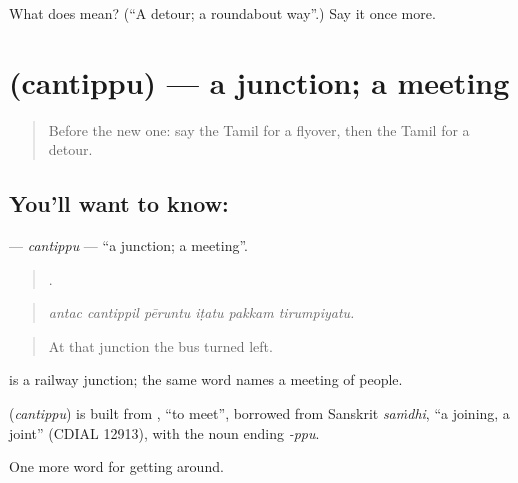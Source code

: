 \begin{tcolorbox}[breakable,colback=teal!4,colframe=teal!35!black,title={Before you move on}]
What does  mean? (\textquotedblleft{}A detour; a roundabout way\textquotedblright{}.) Say it once more.
\end{tcolorbox}
\section[\texorpdfstring{\ta{சந்திப்பு} (cantippu)}{சந்திப்பு (cantippu)}]{ (cantippu) — a junction; a meeting}

\label{lesson:TA-C403-cantippu}



\begin{quote}
Before the new one: say the Tamil for a flyover, then the Tamil for a detour.
\end{quote}

\subsection*{You'll want to know: }
\textbf{} — \emph{cantippu} — \textquotedblleft{}a junction; a meeting\textquotedblright{}.

\begin{quote}
     .
\end{quote}

\begin{quote}
\emph{antac cantippil pēruntu iṭatu pakkam tirumpiyatu.}
\end{quote}

\begin{quote}
At that junction the bus turned left.
\end{quote}

  is a railway junction; the same word names a meeting of people.

\begin{cousinweb}
\textbf{} (\emph{cantippu}) is built from , \textquotedblleft{}to meet\textquotedblright{}, borrowed from Sanskrit \emph{saṁdhi}, \textquotedblleft{}a joining, a joint\textquotedblright{} (CDIAL 12913), with the noun ending \emph{-ppu}.
\end{cousinweb}

\begin{grammarlens}[title={What you've built}]
One more word for getting around.
\end{grammarlens}

